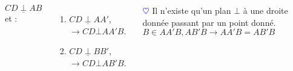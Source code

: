 \documentclass[10pt]{beamer}
\def \heart {\textcolor{blue}{$\heartsuit$} }
\def \orthog {\underline{\perp}}
\begin{document}
{\begin{columns}[t]
		$CD \orthog AB$ et :
		\begin{enumerate}
		 \item $CD \orthog AA'$, $\rightarrow CD \bot AA'B$.
		 \item $CD \orthog BB'$, $\rightarrow CD \bot AB'B$.
		\end{enumerate} \smallskip
		\heart Il n'existe qu'un plan $\bot$ à une droite donnée passant par un point donné. \\ \medskip
		$B\in AA'B,AB'B \rightarrow AA'B=AB'B$
		
		

   
	   \end{columns}
    
    
    
    }
    
\end{document}
